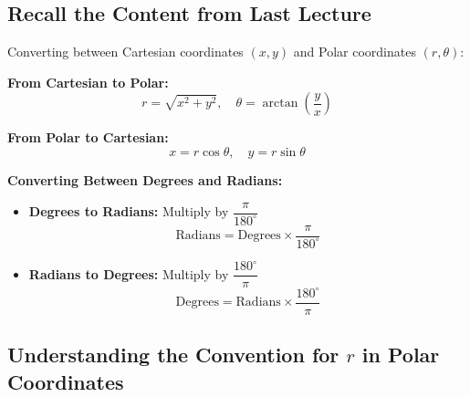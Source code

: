 \documentclass{article}
\begin{document}
\subsection*{Recall the Content from Last Lecture}
\begin{notebox}
Converting between Cartesian coordinates \( (x, y) \) and Polar coordinates \( (r, \theta) \):

\begin{algorithmbox}
    \textbf{From Cartesian to Polar:}
    \[
        r = \sqrt{x^2 + y^2}, \quad \theta = \arctan\left(\frac{y}{x}\right)
    \]
    
    \textbf{From Polar to Cartesian:}
    \[
        x = r\cos\theta, \quad y = r\sin\theta
    \]
\end{algorithmbox}

\textbf{Converting Between Degrees and Radians:}
\begin{algorithmbox}
    \begin{itemize}
        \item \textbf{Degrees to Radians:} Multiply by \( \dfrac{\pi}{180^{\circ}} \)
        \[
        \text{Radians} = \text{Degrees} \times \dfrac{\pi}{180^\circ}
        \]
        \item \textbf{Radians to Degrees:} Multiply by \( \dfrac{180^\circ}{\pi} \)
        \[
        \text{Degrees} = \text{Radians} \times \dfrac{180^\circ}{\pi}
        \]
    \end{itemize}
\end{algorithmbox}
\end{notebox}

\subsection*{Understanding the Convention for \( r \) in Polar Coordinates}
\end{document}
